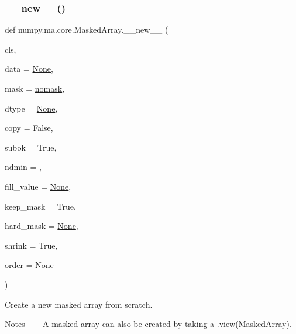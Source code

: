 \subsubsection{\texorpdfstring{\+\_\+\+\_\+new\+\_\+\+\_\+()}{\_\_new\_\_()}}
{\footnotesize\ttfamily def numpy.\+ma.\+core.\+Masked\+Array.\+\_\+\+\_\+new\+\_\+\+\_\+ (\begin{DoxyParamCaption}\item[{}]{cls,  }\item[{}]{data = {\ttfamily \hyperlink{namespacenumpy_1_1ma_1_1core_a647ee1848dfa3692fe35a663a2aa40b3}{None}},  }\item[{}]{mask = {\ttfamily \hyperlink{namespacenumpy_1_1ma_1_1core_abafbbb38c7afc60936cc5a55fa23ecfa}{nomask}},  }\item[{}]{dtype = {\ttfamily \hyperlink{namespacenumpy_1_1ma_1_1core_a647ee1848dfa3692fe35a663a2aa40b3}{None}},  }\item[{}]{copy = {\ttfamily False},  }\item[{}]{subok = {\ttfamily True},  }\item[{}]{ndmin = {},  }\item[{}]{fill\+\_\+value = {\ttfamily \hyperlink{namespacenumpy_1_1ma_1_1core_a647ee1848dfa3692fe35a663a2aa40b3}{None}},  }\item[{}]{keep\+\_\+mask = {\ttfamily True},  }\item[{}]{hard\+\_\+mask = {\ttfamily \hyperlink{namespacenumpy_1_1ma_1_1core_a647ee1848dfa3692fe35a663a2aa40b3}{None}},  }\item[{}]{shrink = {\ttfamily True},  }\item[{}]{order = {\ttfamily \hyperlink{namespacenumpy_1_1ma_1_1core_a647ee1848dfa3692fe35a663a2aa40b3}{None}} }\end{DoxyParamCaption})}

\begin{DoxyVerb}Create a new masked array from scratch.

Notes
-----
A masked array can also be created by taking a .view(MaskedArray).\end{DoxyVerb}
 \mbox{\label{classnumpy_1_1ma_1_1core_1_1MaskedArray_a7a4150532fa7de31b168ca88502b235c}} 
